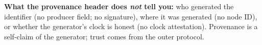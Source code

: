 \textbf{What the provenance header does \emph{not} tell you:} who generated the identifier (no producer field; no signature), where it was generated (no node ID), or whether the generator's clock is honest (no clock attestation). Provenance is a self-claim of the generator; trust comes from the outer protocol.
